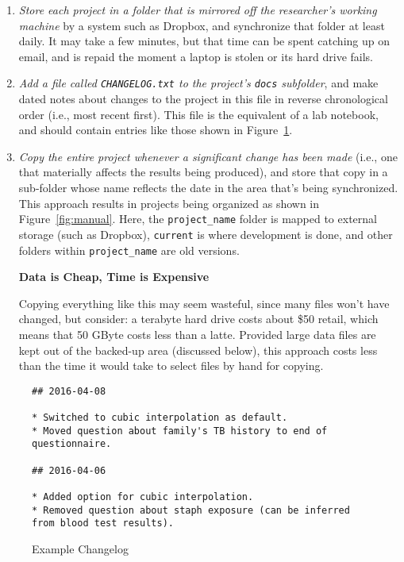 \documentclass[10pt]{article}
\newcommand{\recommend}[1]{\textit{#1}}
\begin{document}
\begin{enumerate}

\item
  \recommend{Store each project in a folder that is mirrored off the
    researcher's working machine} by a system such as Dropbox, and
  synchronize that folder at least daily. It may take a few minutes,
  but that time can be spent catching up on email, and is repaid the
  moment a laptop is stolen or its hard drive fails.

\item
  \recommend{Add a file called \texttt{CHANGELOG.txt} to the project's
    \texttt{docs} subfolder}, and make dated notes about changes to
  the project in this file in reverse chronological order (i.e., most
  recent first). This file is the equivalent of a lab notebook, and
  should contain entries like those shown in
  Figure~\ref{fig:changelog}.

\item
  \recommend{Copy the entire project whenever a significant change has
    been made} (i.e., one that materially affects the results being
  produced), and store that copy in a sub-folder whose name reflects
  the date in the area that's being synchronized. This approach
  results in projects being organized as shown in
  Figure~\ref{fig:manual}.  Here, the \texttt{project\_name} folder is
  mapped to external storage (such as Dropbox), \texttt{current} is
  where development is done, and other folders within
  \texttt{project\_name} are old versions.

  \begin{framed}
    \noindent \textbf{Data is Cheap, Time is Expensive}

    Copying everything like this may seem wasteful, since many files
    won't have changed, but consider: a terabyte hard drive costs
    about \$50 retail, which means that 50 GByte costs less than a
    latte. Provided large data files are kept out of the backed-up
    area (discussed below), this approach costs less than the time it
    would take to select files by hand for copying.
  \end{framed}

\end{enumerate}

\begin{figure}
\begin{verbatim}
## 2016-04-08

* Switched to cubic interpolation as default.
* Moved question about family's TB history to end of questionnaire.

## 2016-04-06

* Added option for cubic interpolation.
* Removed question about staph exposure (can be inferred from blood test results).
\end{verbatim}
\caption{Example Changelog}
\label{fig:changelog}
\end{figure}
\end{document}
